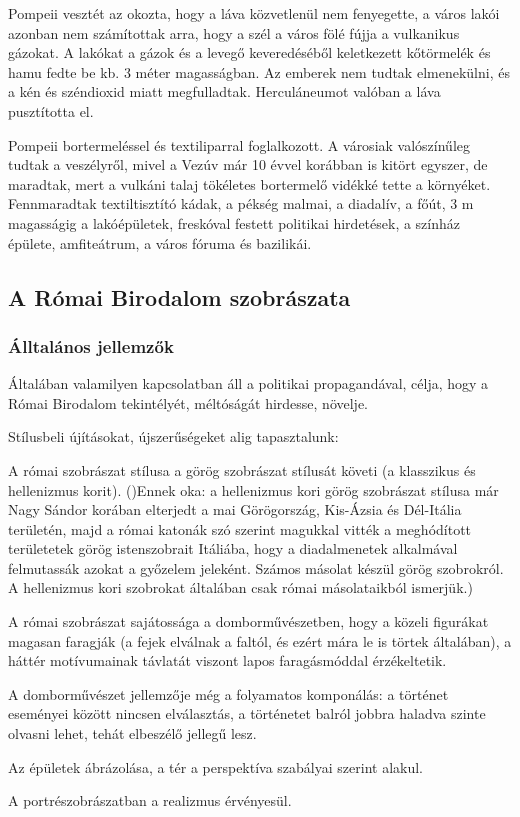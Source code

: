Pompeii vesztét az okozta, hogy a láva közvetlenül nem fenyegette, a város lakói azonban nem számítottak arra, hogy a szél a város fölé fújja a vulkanikus gázokat. A lakókat a gázok és a levegő keveredéséből keletkezett kőtörmelék és hamu fedte be kb. 3 méter magasságban. Az emberek nem tudtak elmenekülni, és a kén és széndioxid miatt megfulladtak. Herculáneumot valóban a láva pusztította el.

Pompeii bortermeléssel és textiliparral foglalkozott. A városiak valószínűleg tudtak a veszélyről, mivel a Vezúv már 10 évvel korábban is kitört egyszer, de maradtak, mert a vulkáni talaj tökéletes bortermelő vidékké tette a környéket. Fennmaradtak textiltisztító kádak, a pékség malmai, a diadalív, a főút, 3 m magasságig a lakóépületek, freskóval festett politikai hirdetések, a színház épülete, amfiteátrum, a város fóruma és bazilikái.

\clearpage

\subsection*{A Római Birodalom szobrászata}

\subsubsection{Álltalános jellemzők}

Általában valamilyen kapcsolatban áll a politikai propagandával, célja, hogy a Római Birodalom tekintélyét, méltóságát hirdesse, növelje.

Stílusbeli újításokat, újszerűségeket alig tapasztalunk:
\begin{compactitem}
	\item A római szobrászat stílusa a görög szobrászat stílusát követi (a klasszikus és hellenizmus korit). ()Ennek oka: a hellenizmus kori görög szobrászat stílusa már Nagy Sándor korában elterjedt a mai Görögország, Kis-Ázsia és Dél-Itália területén, majd a római katonák szó szerint magukkal vitték a meghódított területetek görög istenszobrait Itáliába, hogy a diadalmenetek alkalmával felmutassák azokat a győzelem jeleként. Számos másolat készül görög szobrokról. A hellenizmus kori szobrokat általában csak római másolataikból ismerjük.)
	\item A római szobrászat sajátossága a domborművészetben, hogy a közeli figurákat magasan faragják (a fejek elválnak a faltól, és ezért mára le is törtek általában), a háttér motívumainak távlatát viszont lapos faragásmóddal érzékeltetik.
	\item A domborművészet jellemzője még a folyamatos komponálás: a történet eseményei között nincsen elválasztás, a történetet balról jobbra haladva szinte olvasni lehet, tehát elbeszélő jellegű lesz.
	\item Az épületek ábrázolása, a tér a perspektíva szabályai szerint alakul.
	\item A portrészobrászatban a realizmus érvényesül.
\end{compactitem}

